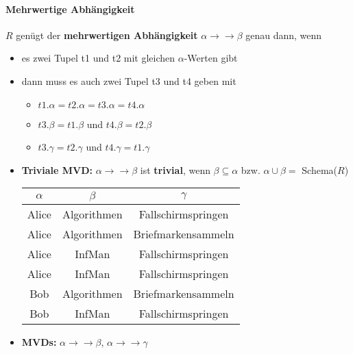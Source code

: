 				\paragraph{Mehrwertige Abhängigkeit}
					\(R\) genügt der \textbf{mehrwertigen Abhängigkeit} \( \alpha \rightarrow \rightarrow \beta\) genau dann, wenn
					\begin{itemize}
						\item es zwei Tupel t1 und t2 mit gleichen \(\alpha\)-Werten gibt
						\item dann muss es auch zwei Tupel t3 und t4 geben mit
							\begin{itemize}
								\item \(t1.\alpha = t2.\alpha = t3.\alpha = t4.\alpha\)
								\item \(t3.\beta = t1.\beta\) und \(t4.\beta = t2.\beta\)
								\item \(t3.\gamma = t2.\gamma\) und \(t4.\gamma = t1.\gamma\)
							\end{itemize}
						\item \textbf{Triviale MVD:} \(\alpha \rightarrow \rightarrow \beta\) ist \textbf{trivial}, wenn \(\beta \subseteq \alpha\) bzw. \(\alpha \cup \beta =\) Schema(\(R\))
							\begin{table}[H]
								\centering
								\begin{tabular}{c | c | c}
									\(\alpha\) & \(\beta\)   & \(\gamma\)         \\ \hline
									Alice      & Algorithmen & Fallschirmspringen \\
									Alice      & Algorithmen & Briefmarkensammeln \\
									Alice      & InfMan      & Fallschirmspringen \\
									Alice      & InfMan      & Fallschirmspringen \\
									Bob        & Algorithmen & Briefmarkensammeln \\
									Bob        & InfMan      & Fallschirmspringen
								\end{tabular}
							\end{table}
						\item \textbf{MVDs:} \(\alpha \rightarrow \rightarrow \beta\), \(\alpha \rightarrow \rightarrow \gamma\)
					\end{itemize}

